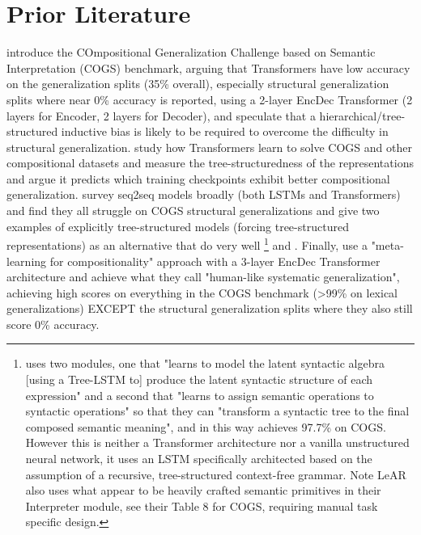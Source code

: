\documentclass[11pt]{article}
\begin{document}
\section{Prior Literature}

\cite{KimLinzen2020} introduce the COmpositional Generalization Challenge based on Semantic Interpretation (COGS) benchmark, arguing that Transformers have low accuracy on the generalization splits (35\% overall), especially structural generalization splits where near 0\% accuracy is reported, using a 2-layer EncDec Transformer (2 layers for Encoder, 2 layers for Decoder), and speculate that a hierarchical/tree-structured inductive bias is likely to be required to overcome the difficulty in structural generalization. \cite{murty2022characterizingintrinsiccompositionalitytransformers} study how Transformers learn to solve COGS and other compositional datasets and measure the tree-structuredness of the representations and argue it predicts which training checkpoints exhibit better compositional generalization. \cite{yao-koller-2022-structural} survey seq2seq models broadly (both LSTMs and Transformers) and find they all struggle on COGS structural generalizations and give two examples of explicitly tree-structured models (forcing tree-structured representations) as an alternative that do very well \cite{liu-etal-2021-learning-algebraic}\footnote{\cite{liu-etal-2021-learning-algebraic} uses two modules, one that "learns to model the latent syntactic algebra [using a Tree-LSTM to] produce the latent syntactic structure of each expression" and a second that "learns to assign semantic operations to syntactic operations" so that they can "transform a syntactic tree to the final composed semantic meaning", and in this way achieves 97.7\% on COGS. However this is neither a Transformer architecture nor a vanilla unstructured neural network, it uses an LSTM specifically architected based on the assumption of a recursive, tree-structured context-free grammar. Note LeAR also uses what appear to be heavily crafted semantic primitives in their Interpreter module, see their Table 8 for COGS, requiring manual task specific design.} and \cite{weissenhorn-etal-2022-compositional}. Finally, \cite{lake2023human} use a "meta-learning for compositionality" approach with a 3-layer EncDec Transformer architecture and achieve what they call "human-like systematic generalization", achieving high scores on everything in the COGS benchmark (>99\% on lexical generalizations) EXCEPT the structural generalization splits where they also still score 0\% accuracy.
\end{document}
